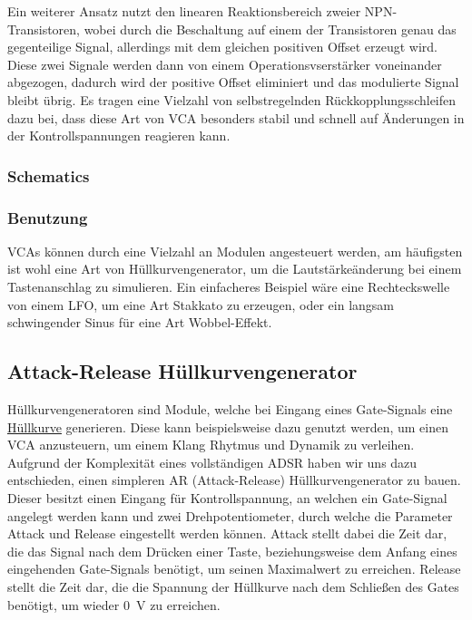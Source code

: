 Ein weiterer Ansatz nutzt den linearen Reaktionsbereich zweier NPN-Transistoren, wobei durch die Beschaltung auf einem der Transistoren genau das gegenteilige Signal, allerdings mit dem gleichen positiven Offset erzeugt wird. Diese zwei Signale werden dann von einem Operationsvserstärker voneinander abgezogen, dadurch wird der positive Offset eliminiert und das modulierte Signal bleibt übrig. Es tragen eine Vielzahl von selbstregelnden Rückkopplungsschleifen dazu bei, dass diese Art von VCA besonders stabil und schnell auf Änderungen in der Kontrollspannungen reagieren kann.
\subsubsection{Schematics}
\label{sec:org69efeef}
\subsubsection{Benutzung}
\label{sec:org2a1628c}
VCAs können durch eine Vielzahl an Modulen angesteuert werden, am häufigsten ist wohl eine Art von Hüllkurvengenerator, um die Lautstärkeänderung bei einem Tastenanschlag zu simulieren. Ein einfacheres Beispiel wäre eine Rechteckswelle von einem LFO, um eine Art Stakkato zu erzeugen, oder ein langsam schwingender Sinus für eine Art Wobbel-Effekt.

\subsection{Attack-Release Hüllkurvengenerator}
\label{sec:org23214fb}
Hüllkurvengeneratoren sind Module, welche bei Eingang eines Gate-Signals eine \href{file:///home/felixp/Documents/diplomarbeit/dokumentation/content/theoretische\_grundlagen.org}{Hüllkurve} generieren. Diese kann beispielsweise dazu genutzt werden, um einen VCA anzusteuern, um einem Klang Rhytmus und Dynamik zu verleihen. Aufgrund der Komplexität eines vollständigen ADSR haben wir uns dazu entschieden, einen simpleren AR (Attack-Release) Hüllkurvengenerator zu bauen. Dieser besitzt einen Eingang für Kontrollspannung, an welchen ein Gate-Signal angelegt werden kann und zwei Drehpotentiometer, durch welche die Parameter Attack und Release eingestellt werden können. Attack stellt dabei die Zeit dar, die das Signal nach dem Drücken einer Taste, beziehungsweise dem Anfang eines eingehenden Gate-Signals benötigt, um seinen Maximalwert zu erreichen. Release stellt die Zeit dar, die die Spannung der Hüllkurve nach dem Schließen des Gates benötigt, um wieder \SI{0}{\volt} zu erreichen.

